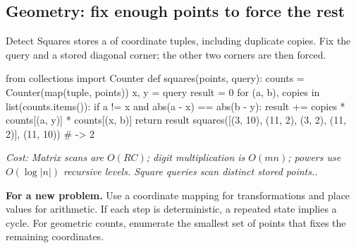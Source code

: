 \documentclass[11pt]{article}
\newcommand{\cd}[1]{{\frenchspacing\texttt{\detokenize{#1}}}}
\newcommand{\transfer}[1]{\par\textbf{For a new problem.} #1\par}
\newcommand{\cost}[1]{\par\textit{Cost: #1.}\par}
\begin{document}
\subsection{Geometry: fix enough points to force the rest}
Detect Squares stores a \cd{Counter} of coordinate tuples, including duplicate copies.
Fix the query and a stored diagonal corner; the other two corners are then forced.
\par\noindent\begin{minipage}{\linewidth}
\hypertarget{example-start-70}{}
\begin{pyex}
from collections import Counter
def squares(points, query):
    counts = Counter(map(tuple, points))
    x, y = query
    result = 0
    for (a, b), copies in list(counts.items()):
        if a != x and abs(a - x) == abs(b - y):
            result += copies * counts[(a, y)] * counts[(x, b)]
    return result
squares([(3, 10), (11, 2), (3, 2), (11, 2)], (11, 10)) # -> 2
\end{pyex}
\hypertarget{example-end-70}{}
\end{minipage}\par
\cost{Matrix scans are \(O(RC)\); digit multiplication is \(O(mn)\); powers use \(O(\log |n|)\) recursive levels.
Square queries scan distinct stored points.}
\transfer{Use a coordinate mapping for transformations and place values for arithmetic.
If each step is deterministic, a repeated state implies a cycle.
For geometric counts, enumerate the smallest set of points that fixes the remaining coordinates.}
\end{document}
